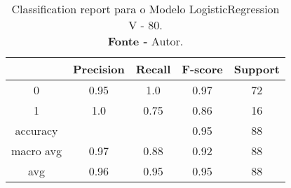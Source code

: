 % 
\begin{table}[H]
    \centering
    \begin{tabular}{@{}ccccc@{}}
    \toprule
     & \textbf{Precision} & \textbf{Recall} &\textbf{F-score} & \textbf{Support} \\ \midrule 
    0 & 0.95 & 1.0 & 0.97 & 72 \\ 
    1 & 1.0 & 0.75 & 0.86 & 16 \\ 
    accuracy &  &  & 0.95 & 88 \\ 
    macro avg & 0.97 & 0.88 & 0.92 & 88 \\ 
    avg & 0.96 & 0.95 & 0.95 & 88 \\ \bottomrule
    \end{tabular}
    \caption{Classification report para o Modelo LogisticRegression V - 80. \\ \textbf{Fonte -} Autor.}
    \label{tab: classification-report-Modelo LogisticRegression V - 80}
\end{table}
